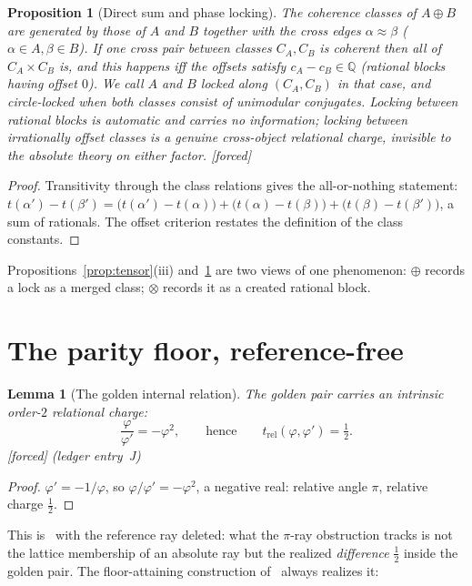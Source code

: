 \documentclass[11pt]{article}
\theoremstyle{plain}
\newtheorem{proposition}[theorem]{Proposition}
\newtheorem{lemma}[theorem]{Lemma}
\theoremstyle{definition}
\theoremstyle{remark}
\newcommand{\Q}{\mathbb{Q}}
\newcommand{\F}{\textnormal{[forced]}}
\begin{document}
\begin{proposition}[Direct sum and phase locking]\label{prop:locking}
The coherence classes of $A\oplus B$ are generated by those of $A$ and $B$
together with the \emph{cross edges} $\alpha\approx\beta$
($\alpha\in A,\beta\in B$). If one cross pair between classes $C_A, C_B$ is
coherent then all of $C_A\times C_B$ is, and this happens iff the offsets satisfy
$c_A-c_B\in\Q$ (rational blocks having offset $0$). We call $A$ and $B$
\emph{locked along $(C_A,C_B)$} in that case, and \emph{circle-locked} when both
classes consist of unimodular conjugates. Locking between rational blocks is
automatic and carries no information; locking between irrationally offset classes
is a genuine cross-object relational charge, invisible to the absolute theory on
either factor. \F
\end{proposition}

\begin{proof}
Transitivity through the class relations gives the all-or-nothing statement:
$t(\alpha')-t(\beta')=\bigl(t(\alpha')-t(\alpha)\bigr)+
\bigl(t(\alpha)-t(\beta)\bigr)+\bigl(t(\beta)-t(\beta')\bigr)$, a sum of
rationals. The offset criterion restates the definition of the class constants.
\end{proof}

Propositions~\ref{prop:tensor}(iii) and~\ref{prop:locking} are two views of one
phenomenon: $\oplus$ records a lock as a merged class; $\otimes$ records it as a
created rational block.

\section{The parity floor, reference-free}\label{sec:parity}

\begin{lemma}[The golden internal relation]\label{lem:golden}
The golden pair carries an intrinsic order-$2$ relational charge:
\[
\frac{\varphi}{\varphi'}=-\varphi^2,\qquad\text{hence}\qquad
t_{\mathrm{rel}}(\varphi,\varphi')=\tfrac12 .
\]
\F{} (ledger entry~J)
\end{lemma}

\begin{proof}
$\varphi'=-1/\varphi$, so $\varphi/\varphi'=-\varphi^2$, a negative real:
relative angle $\pi$, relative charge $\tfrac12$.
\end{proof}

This is~\cite[Lem.~5.2]{CMC} with the reference ray deleted: what the
$\pi$-ray obstruction tracks is not the lattice membership of an absolute ray but
the realized \emph{difference} $\tfrac12$ inside the golden pair. The
floor-attaining construction of~\cite[Thm.~5.1]{CMC} always realizes it:
\end{document}
